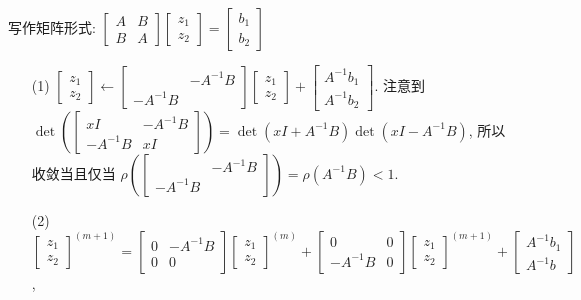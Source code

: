 \documentclass{article}
\begin{document}
\begin{spacing}{1.5}
\begin{itemize}
    写作矩阵形式: $\left[\begin{array}{cc}A&B\\B&A\end{array}\right]\left[\begin{array}{c}z_1\\z_2\end{array}\right]=\left[\begin{array}{c}b_1\\b_2\end{array}\right]$
    \begin{itemize}
        \item [(1)] $\left[\begin{array}{c}z_1\\z_2\end{array}\right]\leftarrow \left[\begin{array}{cc}&-A^{-1}B\\-A^{-1}B\end{array}\right]\left[\begin{array}{c}z_1\\z_2\end{array}\right] + \left[\begin{array}{c}A^{-1}b_1\\A^{-1}b_2\end{array}\right]$.
        注意到 $\det\left(\left[\begin{array}{cc}xI&-A^{-1}B\\-A^{-1}B&xI\end{array}\right]\right) = \det(xI + A^{-1}B)\det(xI - A^{-1}B)$, 所以收敛当且仅当 $\rho\left(\left[\begin{array}{cc}&-A^{-1}B\\-A^{-1}B\end{array}\right]\right) = \rho (A^{-1}B) < 1$.
        \item [(2)] $\left[\begin{array}{c}z_1\\z_2\end{array}\right]^{(m+1)} = \left[\begin{array}{cc}0&-A^{-1}B\\0&0\end{array}\right]\left[\begin{array}{c}z_1\\z_2\end{array}\right]^{(m)} + \left[\begin{array}{cc}0&0\\-A^{-1}B&0\end{array}\right]\left[\begin{array}{c}z_1\\z_2\end{array}\right]^{(m+1)} + \left[\begin{array}{c}A^{-1}b_1\\A^{-1}b\end{array}\right]$, 
        

\end{itemize}
\end{itemize}
\end{spacing}
\end{document}
